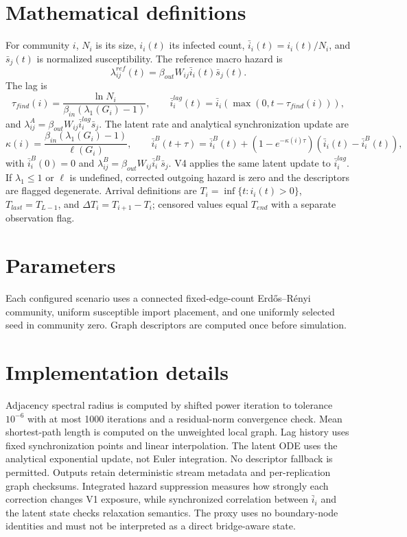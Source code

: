 \documentclass[11pt]{article}
\begin{document}
\section{Mathematical definitions}
For community $i$, $N_i$ is its size, $i_i(t)$ its infected count,
$\bar i_i(t)=i_i(t)/N_i$, and $\bar s_j(t)$ is normalized susceptibility.
The reference macro hazard is
\[\lambda^{ref}_{ij}(t)=\beta_{out}W_{ij}\bar i_i(t)\bar s_j(t).\]
The lag is
\[\tau_{find}(i)=\frac{\ln N_i}{\beta_{in}(\lambda_1(G_i)-1)},\qquad
  \bar i_i^{lag}(t)=\bar i_i(\max(0,t-\tau_{find}(i))),\]
and $\lambda^A_{ij}=\beta_{out}W_{ij}\bar i_i^{lag}\bar s_j$.
The latent rate and analytical synchronization update are
\[\kappa(i)=\frac{\beta_{in}(\lambda_1(G_i)-1)}{\ell(G_i)},\qquad
\bar i_i^B(t+\tau)=\bar i_i^B(t)+(1-e^{-\kappa(i)\tau})
  (\bar i_i(t)-\bar i_i^B(t)),\]
with $\bar i_i^B(0)=0$ and $\lambda^B_{ij}=\beta_{out}W_{ij}\bar i_i^B\bar s_j$.
V4 applies the same latent update to $\bar i_i^{lag}$. If $\lambda_1\le1$ or
$\ell$ is undefined, corrected outgoing hazard is zero and the descriptors are
flagged degenerate. Arrival definitions are $T_i=\inf\{t:i_i(t)>0\}$,
$T_{last}=T_{L-1}$, and $\Delta T_i=T_{i+1}-T_i$; censored values equal
$T_{end}$ with a separate observation flag.

\section{Parameters}
Each configured scenario uses a connected fixed-edge-count Erd\H{o}s--R\'enyi
community, uniform susceptible import placement, and one uniformly selected seed
in community zero. Graph descriptors are computed once before simulation.

\section{Implementation details}
Adjacency spectral radius is computed by shifted power iteration to tolerance
$10^{-6}$ with at most 1000 iterations and a residual-norm convergence check.
Mean shortest-path length is computed on the unweighted local graph. Lag history
uses fixed synchronization points and linear interpolation. The latent ODE uses
the analytical exponential update, not Euler integration. No descriptor fallback
is permitted. Outputs retain deterministic stream metadata and per-replication
graph checksums. Integrated hazard suppression measures how strongly each correction
changes V1 exposure, while synchronized correlation between $\bar i_i$ and the latent
state checks relaxation semantics. The proxy uses no boundary-node identities and
must not be interpreted as a direct bridge-aware state.
\end{document}
